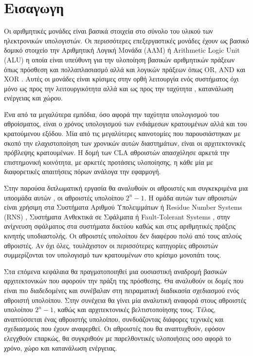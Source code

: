 
\section{Εισαγωγη}

Οι αριθμητικές μονάδες είναι βασικά στοιχεία στο σύνολο του υλικού των ηλεκτρονικών υπολογιστών. Οι περισσότερες επεξεργαστικές μονάδες έχουν ως βασικό δομικό στοιχείο την Αριθμητική Λογική Μονάδα (ΑΛΜ) ή Arithmetic Logic Unit (ALU) η οποία είναι υπεύθυνη για την υλοποίηση βασικών αριθμητικών πράξεων όπως πρόσθεση και πολλαπλασιασμό αλλά και λογικών πράξεων όπως OR, AND και XOR . Αυτές οι μονάδες είναι κρίσιμες στην ορθή λειτουργία ενός συστήματος όχι μόνο ως προς την λειτουργικότητα αλλά και ως προς την ταχύτητα , κατανάλωση ενέργειας και χώρου. 

Ένα από τα μεγαλύτερα εμπόδια, όσο αφορά την ταχύτητα υπολογισμού του αθροίσματος, είναι ο 
χρόνος υπολογισμού των ενδιάμεσων κρατουμένων αλλά και του κρατούμενου εξόδου. Μία από τις
μεγαλύτερες καινοτομίες που παρουσιάστηκαν με σκοπό την ελαχιστοποίηση των χρονικών αυτών 
διαστημάτων, είναι οι αρχιτεκτονικές πρόβλεψης κρατουμένων. Η δομή των CLA αθροιστών 
απασχόλησε αρκετά την επιστημονική κοινότητα, με αρκετές προτάσεις υλοποίησης, η κάθε μία
με διαφορετικές απαιτήσεις πόρων ανάλογα την εφαρμογή.


Στην παρούσα διπλωματική εργασία θα αναλυθούν οι αθροιστές και συγκεκριμένα μια υποομάδα αυτών , οι αθροιστές υπολοίπου $2^n-1$. Η ομάδα αυτών των αθροιστών είναι χρήσιμη στα Συστήματα Αριθμού Υπολειμμάτων ή Residue Number Systems (RNS) , Συστήματα Ανθεκτικά σε Σφάλματα ή Fault-Tolerant Systems , στην ανίχνευση σφάλματος στα συστήματα δικτύου καθώς και στις αριθμητικές πράξεις κινητής υποδιαστολής. Οι αθροιστές υπολοίπου δεν διαφέρου πολύ από τους απλούς αθροιστές.
Αν όχι όλες, τουλάχιστον οι περισσότερες κατηγορίες αθροιστών συμμερίζονται τον υπολογισμό
των κρατουμένων στο κρίσιμο μονοπάτι τους.

Στα επόμενα κεφάλαια θα πραγματοποιηθεί μια ουσιαστική αναδρομή βασικών αρχιτεκτονικών 
που αφορούν την πράξη της πρόσθεσης. Θα αναλυθούν οι δομές που είναι πιο διαδεδομένες και
συνέβαλαν στη πειραματική διαδικασία σχεδιασμού ενός αθροιστή υπολοίπου. Στην συνέχεια 
θα γίνει μία αναλυτική αναφορά στους αθροιστές υπολοίπου $2^n-1$, καθώς και αρχιτεκτονικές
βελτιστοποίησης τους. Τέλος, αναπτύσσεται ένας αθροιστής υπολοίπου, συνδυάζοντας διάφορες 
τεχνικές και σχεδιασμούς που έχουν αναφερθεί. Οι αθροιστές που θα αναπτυχθούν, εφόσον ελεγχθούν επαρκώς, θα συγκριθούν με παρελθοντικές υλοποιήσεις οσο αφορά το χρόνο, χώρο και κατανάλωση ενέργειας.


